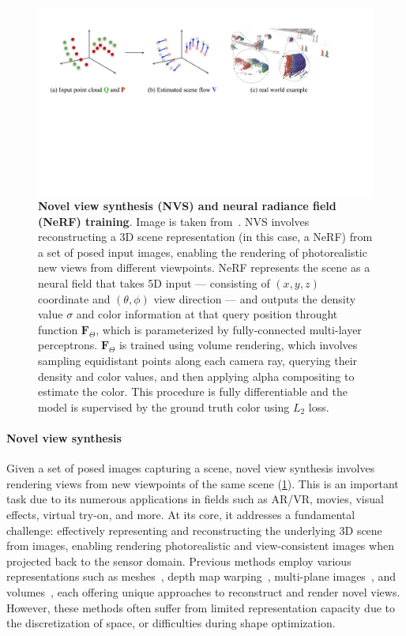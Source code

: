 \begin{figure}[t]
    \centering
    \includegraphics[width=1.0\columnwidth]{imgs/nerf.pdf}
    \caption{\textbf{Novel view synthesis (NVS) and neural radiance field (NeRF) training}. Image is taken from~\cite{mildenhall2020nerf}. NVS involves reconstructing a 3D scene representation (in this case, a NeRF) from a set of posed input images, enabling the rendering of photorealistic new views from different viewpoints. NeRF represents the scene as a neural field that takes 5D input — consisting of $(x, y, z)$ coordinate and $(\theta, \phi)$ view direction — and outputs the density value ${\sigma}$ and color information at that query position throught function $\mathbf{F}_{\Theta}$, which is parameterized by fully-connected multi-layer perceptrons. $\mathbf{F}_{\Theta}$ is trained using volume rendering, which involves sampling equidistant points along each camera ray, querying their density and color values, and then applying alpha compositing to estimate the color. This procedure is fully differentiable and the model is supervised by the ground truth color using $L_2$ loss.}
    \label{fig:nerf_illustration}
\end{figure}

\paragraph{Novel view synthesis}
Given a set of posed images capturing a scene, novel view synthesis involves rendering views from new viewpoints of the same scene (\cref{fig:nerf_illustration}). This is an important task due to its numerous applications in fields such as AR/VR, movies, visual effects, virtual try-on, and more. At its core, it addresses a fundamental challenge: effectively representing and reconstructing the underlying 3D scene from images, enabling rendering photorealistic and view-consistent images when projected back to the sensor domain. Previous methods employ various representations such as meshes~\cite{buehler2001unstructured,debevec2023modeling}, depth map warping~\cite{chen2023view,shade1998layered}, multi-plane images~\cite{flynn2019deepview,srinivasan2019pushing}, and volumes~\cite{henzler2018single,Lombardi2019,curless1996volumetric}, each offering unique approaches to reconstruct and render novel views. However, these methods often suffer from limited representation capacity due to the discretization of space, or difficulties during shape optimization.

